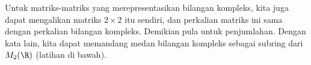 
Untuk matriks-matriks yang merepresentasikan bilangan kompleks,
kita juga dapat mengalikan matriks $2 \times 2$ itu sendiri,
dan perkalian matriks ini sama dengan perkalian bilangan kompleks.
Demikian pula untuk penjumlahan.
Dengan kata lain, kita dapat memandang medan bilangan kompleks sebagai
subring dari $M_2(\R)$ (latihan di bawah).

